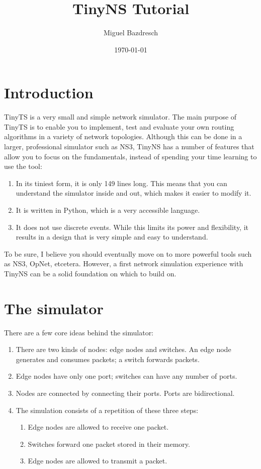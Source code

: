 \documentclass[11pt]{report}
\begin{document}
\title{TinyNS Tutorial}
\author{Miguel Bazdresch}
\date{\today}

\maketitle
\thispagestyle{empty}

\section*{Introduction}

TinyTS is a very small and simple network simulator. The main purpose of TinyTS
is to enable you to implement, test and evaluate your own routing
algorithms in a variety of network topologies. Although this can be done in a
larger, professional simulator such as NS3, TinyNS has a number of features
that allow you to focus on the fundamentals, instead of spending your
time learning to use the tool:

\begin{enumerate}
	\item In its tiniest form, it is only 149 lines long. This means that you
		can understand the simulator inside and out, which makes it easier to
		modify it.
	\item It is written in Python, which is a very accessible language.
	\item It does not use discrete events. While this limits its
		power and flexibility, it results in a design that is very simple and
		easy to understand.
\end{enumerate}

To be sure, I believe you should eventually move on to more powerful
tools such as NS3, OpNet, etcetera. However, a first network simulation
experience with TinyNS can be a solid foundation on which to build on.

\section*{The simulator}

There are a few core ideas behind the simulator:

\begin{enumerate}
	\item There are two kinds of nodes: edge nodes and switches. An edge node
		generates and consumes packets; a switch forwards packets.
	\item Edge nodes have only one port; switches can have any number of ports.
	\item Nodes are connected by connecting their ports. Ports are
		bidirectional.
	\item The simulation consists of a repetition of these three steps:
		\begin{enumerate}
			\item Edge nodes are allowed to receive one packet.
			\item Switches forward one packet stored in their memory.
			\item Edge nodes are allowed to transmit a packet.
		\end{enumerate}
\end{enumerate}
\end{document}
